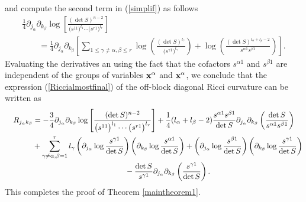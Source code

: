 \documentclass[pdftex]{sigma}
\numberwithin{equation}{section}
\newcommand{\jalpha}{j_{\alpha}}
\newcommand{\kbeta}{k_{\beta}}
\newcommand{\lbeta}{l_{\beta}}
\newcommand{\lalpha}{l_{\alpha}}
\newcommand{\lgamma}{l_{\gamma}}
\begin{document}
and compute the second term in (\ref{simplif}) as follows
\begin{gather*}
\frac{1}{4}\partial_{j_{\alpha}}\partial_{k_{\beta}}\log\left[\frac{(\det S)^{n-2}}{\big(s^{11}\big)^{l_{1}}\cdots \big(s^{r1}\big)^{l_{r}}}\right]\\
\qquad{} =\frac{1}{4}\partial_{j_{\alpha}}\partial_{k_{\beta}}\left[ \sum_{1\leq \gamma \neq \alpha, \beta\leq r} \log\left( \frac{(\det S)^{\lgamma}}{\big(s^{\gamma 1}\big)^{\lgamma}}\right)+\log\left(\frac{(\det S)^{\lalpha+\lbeta-2}}{s^{\alpha 1}s^{\beta 1}}\right)\right].
\end{gather*}
Evaluating the derivatives an using the fact that the cofactors $s^{\alpha 1}$ and $s^{\beta 1}$ are independent of the groups of variables ${\bf x}^{\alpha}$ and ${\bf x}^{\alpha}$, we conclude that the expression (\ref{Riccialmostfinal}) of the off-block diagonal Ricci curvature can be written as
\begin{gather*}
R_{\jalpha \kbeta} =-\frac{3}{4}\partial_{j_{\alpha}}\partial_{k_{\beta}}\log\left[\frac{(\det S)^{n-2}}{\big(s^{11}\big)^{l_{1}}\cdots \big(s^{r1}\big)^{l_{r}}}\right] + \frac{1}{4} (l_{\alpha}+l_{\beta}-2)\frac{s^{\alpha 1}s^{\beta 1}}{\det S}\partial_{j_{\alpha}}\partial_{k_{\beta}}\left(\frac{\det S}{s^{\alpha 1}s^{\beta 1}}\right)\\
\hphantom{R_{\jalpha \kbeta} =}{}+
\sum_{\gamma\neq \alpha,\beta=1}^{r}l_{\gamma}\left(\partial_{j_{\alpha}}\log\frac{s^{\gamma 1}}{\det S}\right)\left(\partial_{k_{\beta}}\log\frac{s^{\alpha 1}}{\det S}\right)
+\left(\partial_{j_{\alpha}}\log\frac{s^{\beta 1}}{\det S}\right)\left(\partial_{k_{\beta}}\log\frac{s^{\gamma 1}}{\det S}\right)\\
\hphantom{R_{\jalpha \kbeta} =}{}
-\frac{\det S}{s^{\gamma 1}}\partial_{\jalpha}\partial_{\kbeta}\left(\frac{s^{\gamma 1}}{\det S}\right).
\end{gather*}
This completes the proof of Theorem \ref{maintheorem1}.
\end{document}
